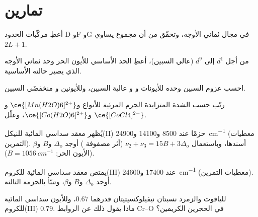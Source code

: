 \section{تمارين}

\begin{exercise}[$\star$]\label{exo:b3:complex-spectra-magnetism:1}
أعطِ مركّبات الحدود D وF وG في مجال ثماني الأوجه، وتحقّق من أن
مجموع  يساوي $2L + 1$.
\end{exercise}

\begin{exercise}[$\star$]\label{exo:b3:complex-spectra-magnetism:2}
من أجل $d^1$ إلى $d^9$ (عالي السبين)، أعطِ الحد الأساسي للأيون الحر وحد ثماني الأوجه الذي
يصير حالته الأساسية.
\end{exercise}

\begin{exercise}[$\star$]\label{exo:b3:complex-spectra-magnetism:3}
احسب عزوم السبين وحده للأيونات  و و عالية السبين، وللأيونين
 و منخفضَي السبين.
\end{exercise}

\begin{exercise}[$\star$]\label{exo:b3:complex-spectra-magnetism:4}
رتّب حسب الشدة المتزايدة الحزم المرئية للأنواع  و$\ce{[Mn(H2O)6]^{2+}}$ و$\ce{[CoCl4]^{2-}}$ 
و$\ce{[Co(H2O)6]^{2+}}$، وعلّل.
\end{exercise}

\begin{exercise}[$\star\star$]\label{exo:b3:complex-spectra-magnetism:5}
يُظهر معقد سداسي المائية للنيكل(II) حزمًا عند 8500 و14100 و\qty{24900}{cm^{-1}} (معطيات
التمرين). أسندها، وباستعمال $\nu_2 + \nu_3 = 15B + 3\Delta_{\mathrm o}$ (أثر مصفوفة )
أوجد $\Delta_{\mathrm o}$ و$B$ و$\beta$ (الأيون الحر: $B = \qty{1056}{cm^{-1}}$).
\end{exercise}

\begin{exercise}[$\star\star$]\label{exo:b3:complex-spectra-magnetism:6}
يمتص معقد سداسي المائية للكروم(III) عند 17400 و\qty{24600}{cm^{-1}} (معطيات
التمرين). أوجد $\Delta_{\mathrm o}$ و$B$ و$\beta$، وتنبّأ بالحزمة الثالثة.
\end{exercise}

\begin{exercise}[$\star\star$]\label{exo:b3:complex-spectra-magnetism:7}
للياقوت والزمرد نسبتان نيفيلوكسيتيتان قدرهما 0.67، وللأيون سداسي المائية للكروم(III)
0.79. ماذا يقول ذلك عن الروابط Cr--O في الحجرين الكريمين؟
\end{exercise}

